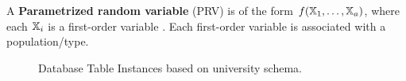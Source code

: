 \documentclass{vldb}
\begin{document}
A \textbf{Parametrized random variable} (PRV) is of the form $f(\mathbb{X}_{1},\ldots,\mathbb{X}_{a})$, where each $\mathbb{X}_{i}$ is a first-order variable \cite{Poole2003}. 
Each first-order variable is associated with a population/type. 
\begin{figure}[htbp] %
 \centering
{}
\caption{Database Table Instances based on university schema.%
}
 \label{fig:university-tables}
\end{figure}
\end{document}
